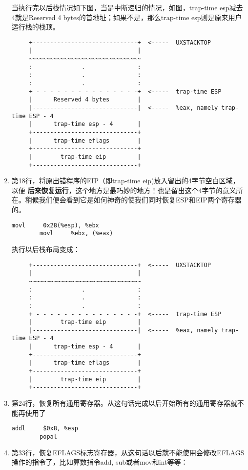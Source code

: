 \documentclass{article}
\newcommand{\highlight}[1]{{\bfseries \color{red}  #1}}
\begin{document}
\begin{CJK*}{UTF8}{gkai}
\begin{enumerate}
{当执行完以后栈情况如下图，当是中断递归的情况，如图，trap-time esp减去4就是Reserved 4 bytes的首地址；如果不是，那么trap-time esp则是原来用户运行栈的栈顶。


{\scriptsize \bfseries
\begin{verbatim}
     +------------------------------+  <-----  UXSTACKTOP
     |                              | 
     ~~~~~~~~~~~~~~~~~~~~~~~~~~~~~~~~
     :              .               :
     :              .               :
     :              .               :
     + - - - - - - - - - - - - - - -+  <-----  trap-time ESP
     |      Reserved 4 bytes        |
     |------------------------------|  <-----  %eax, namely trap-time ESP - 4
     |      trap-time esp - 4       | 
     +------------------------------+ 
     |      trap-time eflags        |
     +------------------------------+ 
     |        trap-time eip         |
     +------------------------------+ 
\end{verbatim}
}
}
\item{第18行，将原出错程序的EIP（即trap-time eip)放入留出的4字节空白区域，以便\highlight{后来恢复运行}，这个地方是最巧妙的地方！也是留出这个4字节的意义所在。稍候我们便会看到它是如何神奇的使我们同时恢复ESP和EIP两个寄存器的。

\begin{lstlisting}[style=acode, firstnumber=18, title={\scriptsize \ttfamily \bfseries lib/pfentry.S}]
        movl     0x28(%esp), %ebx
        movl     %ebx, (%eax)
\end{lstlisting}

执行以后栈布局变成：

{\scriptsize \bfseries
\begin{verbatim}
     +------------------------------+  <-----  UXSTACKTOP
     |                              | 
     ~~~~~~~~~~~~~~~~~~~~~~~~~~~~~~~~
     :              .               :
     :              .               :
     :              .               :
     + - - - - - - - - - - - - - - -+  <-----  trap-time ESP
     |        trap-time eip         |
     |------------------------------|  <-----  %eax, namely trap-time ESP - 4
     |      trap-time esp - 4       | 
     +------------------------------+ 
     |      trap-time eflags        |
     +------------------------------+ 
     |        trap-time eip         |
     +------------------------------+ 
\end{verbatim}
}
}
\item{第24行，恢复所有通用寄存器。从这句话完成以后开始所有的通用寄存器就不能再使用了
\begin{lstlisting}[style=acode, firstnumber=24, title={\scriptsize \ttfamily \bfseries lib/pfentry.S}]
        addl     $0x8, %esp
        popal
\end{lstlisting}
}
\item{第33行，恢复EFLAGS标志寄存器，从这句话以后就不能使用会修改EFLAGS操作的指令了，比如算数指令add, sub或者mov和int等等：

}
\end{enumerate}
\end{CJK*}
\end{document}
